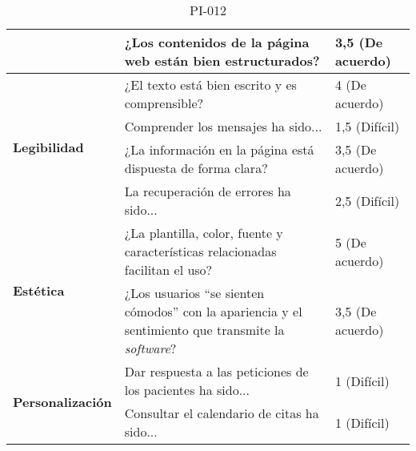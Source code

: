 \begin{table}[htpb]
\begin{tabularx}{\textwidth}{|l|X|l|}
                                          & ¿Los contenidos de la página web están bien estructurados?                                                          & 3,5 (De acuerdo)    \\ \hline
\multirow{4}{*}{\textbf{Legibilidad}}     & ¿El texto está bien escrito y es comprensible?                                                                      & 4 (De acuerdo)      \\ \cline{2-3} 
                                          & Comprender los mensajes ha sido...                                                                                  & 1,5 (Difícil)       \\ \cline{2-3} 
                                          & ¿La información en la página está dispuesta de forma clara?                                                         & 3,5 (De acuerdo)    \\ \cline{2-3} 
                                          & La recuperación de errores ha sido...                                                                               & 2,5 (Difícil)       \\ \hline
\multirow{2}{*}{\textbf{Estética}}        & ¿La plantilla, color, fuente y características relacionadas facilitan el uso?                                       & 5 (De acuerdo)      \\ \cline{2-3} 
                                          & ¿Los usuarios “se sienten cómodos” con la apariencia y el sentimiento que transmite la \textit{software}?                      & 3,5 (De acuerdo)    \\ \hline
\multirow{2}{*}{\textbf{Personalización}} & Dar respuesta a las peticiones de los pacientes ha sido...                                                          & 1 (Difícil)         \\ \cline{2-3} 
                                          & Consultar el calendario de citas ha sido...                                                                         & 1 (Difícil)         \\ \hline
\end{tabularx}
\caption{PI-012}
\end{table}


